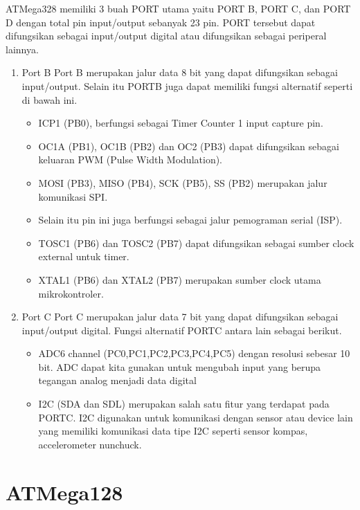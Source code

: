 	ATMega328 memiliki 3 buah PORT utama yaitu PORT B, PORT C, dan PORT D dengan total pin input/output sebanyak 23 pin. PORT tersebut dapat difungsikan sebagai input/output digital atau difungsikan sebagai periperal lainnya.
	\begin{enumerate}
	\item Port B 
		Port B merupakan jalur data 8 bit yang dapat difungsikan sebagai input/output. Selain itu PORTB juga dapat memiliki fungsi alternatif seperti di bawah ini.
		\begin{itemize}
			\item ICP1 (PB0), berfungsi sebagai Timer Counter 1 input capture pin. 
			\item OC1A (PB1), OC1B (PB2) dan OC2 (PB3) dapat difungsikan sebagai keluaran PWM (Pulse Width Modulation).
			\item MOSI (PB3), MISO (PB4), SCK (PB5), SS (PB2) merupakan jalur komunikasi SPI.
			\item Selain itu pin ini juga berfungsi sebagai jalur pemograman serial (ISP).
			\item TOSC1 (PB6) dan TOSC2 (PB7) dapat difungsikan sebagai sumber clock external untuk timer.
			\item XTAL1 (PB6) dan XTAL2 (PB7) merupakan sumber clock utama mikrokontroler.
		\end{itemize}
		
	\item Port C
		Port C merupakan jalur data 7 bit yang dapat difungsikan sebagai input/output digital. Fungsi alternatif PORTC antara lain sebagai berikut.
		\begin {itemize}
			\item ADC6 channel (PC0,PC1,PC2,PC3,PC4,PC5) dengan resolusi sebesar 10 bit. ADC dapat kita gunakan untuk mengubah input yang berupa tegangan analog menjadi data digital
			\item I2C (SDA dan SDL) merupakan salah satu fitur yang terdapat pada PORTC. I2C digunakan untuk komunikasi dengan sensor atau device lain yang memiliki komunikasi data tipe I2C seperti sensor kompas, accelerometer nunchuck. 
		\end {itemize}

	\end{enumerate}
\section{ATMega128}
